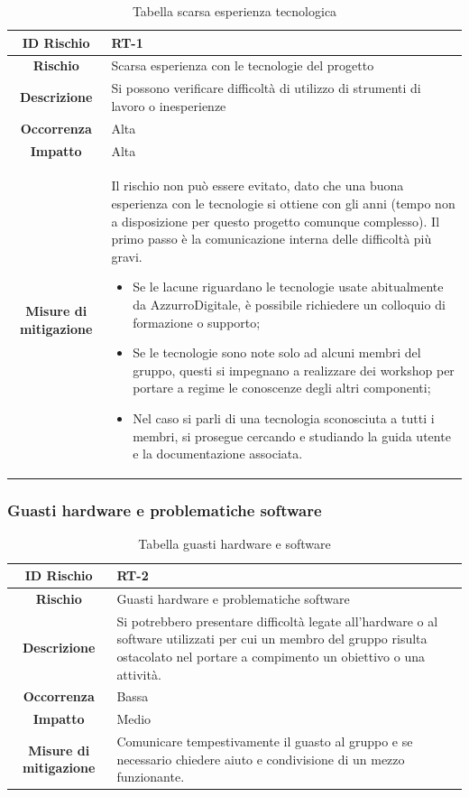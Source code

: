 \documentclass[10pt, a4paper]{article}
\begin{document}
{{{{{\renewcommand{\arraystretch}{1.5}
\begin{table}[H]
\begin{tabularx}{\textwidth}{c|X}
\textbf{ID Rischio} & RT-1 \\
\hline
\textbf{Rischio} & Scarsa esperienza con le tecnologie del progetto \\
\hline
\textbf{Descrizione} & Si possono verificare difficoltà di utilizzo di strumenti di lavoro o inesperienze\\
\hline
\textbf{Occorrenza} & Alta\\
\hline
\textbf{Impatto} & Alta\\
\hline
\textbf{Misure di mitigazione} & Il rischio non può essere evitato, dato che una buona esperienza con le tecnologie si ottiene con gli anni (tempo non a disposizione per questo progetto comunque complesso). Il primo passo è la comunicazione interna delle difficoltà più gravi.
\begin{itemize}
    \item Se le lacune riguardano le tecnologie usate abitualmente da AzzurroDigitale, è possibile richiedere un colloquio di formazione o supporto;
    \item Se le tecnologie sono note solo ad alcuni membri del gruppo, questi si impegnano a realizzare dei workshop per portare a regime le conoscenze degli altri componenti;
    \item Nel caso si parli di una tecnologia sconosciuta a tutti i membri, si prosegue cercando e studiando la guida utente e la documentazione associata.
\end{itemize}
\end{tabularx}
\caption{Tabella scarsa esperienza tecnologica}
\end{table}


\subsubsection{Guasti hardware e problematiche software}

{\renewcommand{\arraystretch}{1.5}
\begin{table}[H]
\begin{tabularx}{\textwidth}{c|X}
\textbf{ID Rischio} & RT-2 \\
\hline
\textbf{Rischio} & Guasti hardware e problematiche software \\
\hline
\textbf{Descrizione} & Si potrebbero presentare difficoltà legate all’hardware o al software utilizzati per cui un membro del gruppo risulta ostacolato nel portare a compimento un obiettivo o una attività. \\
\hline
\textbf{Occorrenza} & Bassa \\
\hline
\textbf{Impatto} & Medio\\
\hline
\textbf{Misure di mitigazione} & Comunicare tempestivamente il guasto al gruppo e se necessario chiedere aiuto e condivisione di un mezzo funzionante.\\
\end{tabularx}
\caption{Tabella guasti hardware e software}
\end{table}


}}}}}}
\end{document}
